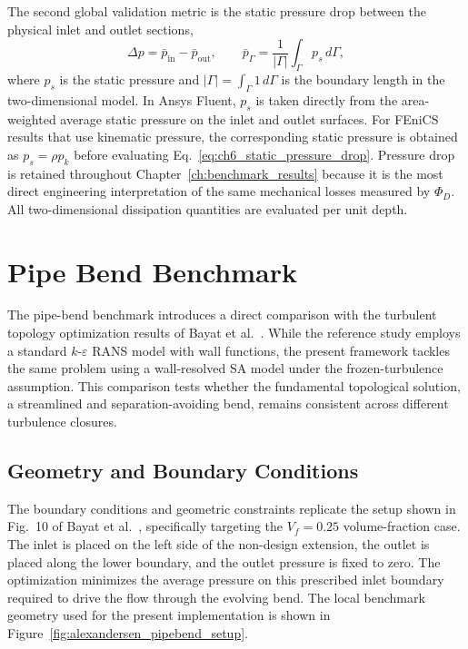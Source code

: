 The second global validation metric is the static pressure drop between the physical inlet and outlet sections,
\begin{equation}
	\Delta p =
	\bar{p}_{\mathrm{in}}-\bar{p}_{\mathrm{out}},
	\qquad
	\bar{p}_{\Gamma} =
	\frac{1}{|\Gamma|}
	\int_{\Gamma} p_s\,d\Gamma ,
	\label{eq:ch6_static_pressure_drop}
\end{equation}
where $p_s$ is the static pressure and $|\Gamma|=\int_{\Gamma}1\,d\Gamma$ is the boundary length in the two-dimensional model. In Ansys Fluent, $p_s$ is taken directly from the area-weighted average static pressure on the inlet and outlet surfaces. For FEniCS results that use kinematic pressure, the corresponding static pressure is obtained as $p_s=\rho p_k$ before evaluating Eq.~\ref{eq:ch6_static_pressure_drop}. Pressure drop is retained throughout Chapter~\ref{ch:benchmark_results} because it is the most direct engineering interpretation of the same mechanical losses measured by $\Phi_D$. All two-dimensional dissipation quantities are evaluated per unit depth.

\section{Pipe Bend Benchmark}
\label{sec:alexandersen_pipebend}
The pipe-bend benchmark introduces a direct comparison with the turbulent topology optimization results of Bayat et al.~\cite{Bayat2026}. While the reference study employs a standard $k$-$\varepsilon$ RANS model with wall functions, the present framework tackles the same problem using a wall-resolved SA model under the frozen-turbulence assumption. This comparison tests whether the fundamental topological solution, a streamlined and separation-avoiding bend, remains consistent across different turbulence closures.

\subsection{Geometry and Boundary Conditions}
\label{subsec:alexandersen_pipebend_setup}
The boundary conditions and geometric constraints replicate the setup shown in Fig.~10 of Bayat et al.~\cite{Bayat2026}, specifically targeting the $V_f=0.25$ volume-fraction case. The inlet is placed on the left side of the non-design extension, the outlet is placed along the lower boundary, and the outlet pressure is fixed to zero. The optimization minimizes the average pressure on this prescribed inlet boundary required to drive the flow through the evolving bend.
The local benchmark geometry used for the present implementation is shown in Figure~\ref{fig:alexandersen_pipebend_setup}.

